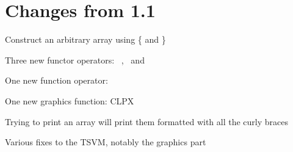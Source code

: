 \chapter{Changes from 1.1}

\begin{itemlist}
\item Construct an arbitrary array using \{ and \}
\item Three new functor operators: \basicinfixmap\ , \basiccurrymap\ and \basicseqapp
\item One new function operator: \basicpipe
\item One new graphics function: CLPX
\item Trying to print an array will print them formatted with all the curly braces
\item Various fixes to the TSVM, notably the graphics part
\end{itemlist}
